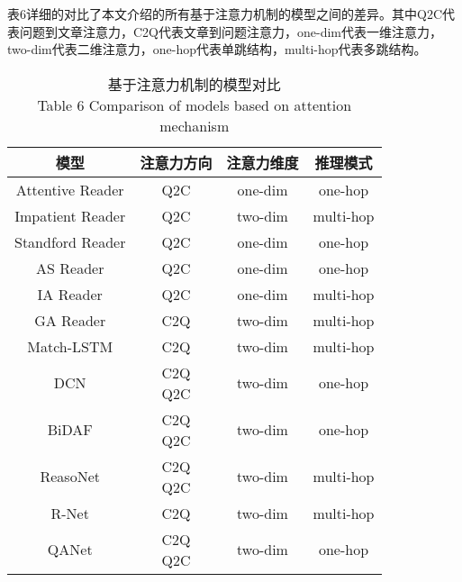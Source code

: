表6详细的对比了本文介绍的所有基于注意力机制的模型之间的差异。其中Q2C代表问题到文章注意力，C2Q代表文章到问题注意力，one-dim代表一维注意力，two-dim代表二维注意力，one-hop代表单跳结构，multi-hop代表多跳结构。
\begin{table}[ht]
	\centering
	\caption{基于注意力机制的模型对比 \\ Table 6 Comparison of models based on attention mechanism}
	\begin{tabular}{c c c c}
		\toprule
		模型&注意力方向&注意力维度&推理模式 \\
		\midrule
		Attentive Reader\upcite{Hermann}&Q2C&one-dim&one-hop \\
		\midrule
		Impatient Reader\upcite{Hermann}&Q2C&two-dim&multi-hop \\
		\midrule
		Standford Reader\upcite{AR}&Q2C&one-dim&one-hop \\
		\midrule
		AS Reader\upcite{ASR}&Q2C&one-dim&one-hop \\
		\midrule
		IA Reader\upcite{IAReader}&Q2C&one-dim&multi-hop \\
		\midrule
		GA Reader\upcite{GAReader}&C2Q&two-dim&multi-hop \\
		\midrule
		Match-LSTM\upcite{MatchLSTM}&C2Q&two-dim&multi-hop \\
		\midrule
		DCN\upcite{DCN}&\tabincell{c}{C2Q \\
			Q2C}&two-dim&one-hop \\           
		\midrule
		BiDAF\upcite{BiDAF}&\tabincell{c}{C2Q\\ Q2C}&two-dim&one-hop \\
		\midrule
		ReasoNet\upcite{Reasonet}&\tabincell{c}{C2Q\\ Q2C}&two-dim&multi-hop\\
		\midrule
		R-Net\upcite{RNet}&C2Q&two-dim&multi-hop \\
		\midrule
		QANet\upcite{QANet}&\tabincell{c}{C2Q\\ Q2C}&two-dim&one-hop\\
		\bottomrule
	\end{tabular}
\end{table}


